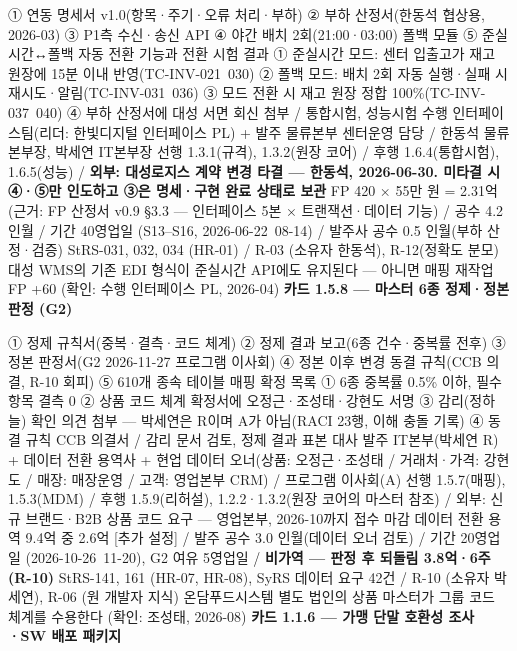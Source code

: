 \documentclass[10pt,a4paper]{article}
\begin{document}
 {① 연동 명세서 v1.0(항목·주기·오류 처리·부하) ② 부하 산정서(한동석 협상용, 2026-03) ③ P1측 수신·송신 API ④ 야간 배치 2회(21:00·03:00) 폴백 모듈 ⑤ 준실시간↔폴백 자동 전환 기능과 전환 시험 결과}
 {① 준실시간 모드: 센터 입출고가 재고 원장에 15분 이내 반영(TC-INV-021~030) ② 폴백 모드: 배치 2회 자동 실행·실패 시 재시도·알림(TC-INV-031~036) ③ 모드 전환 시 재고 원장 정합 100\%(TC-INV-037~040) ④ 부하 산정서에 대성 서면 회신 첨부 / 통합시험, 성능시험}
 {수행 인터페이스팀(리더: 한빛디지털 인터페이스 PL) + 발주 물류본부 센터운영 담당 / 한동석 물류본부장, 박세연 IT본부장}
 {선행 1.3.1(규격), 1.3.2(원장 코어) / 후행 1.6.4(통합시험), 1.6.5(성능) / \textbf{외부: 대성로지스 계약 변경 타결 — 한동석, 2026-06-30. 미타결 시 ④·⑤만 인도하고 ③은 명세·구현 완료 상태로 보관}}
 {FP 420 × 55만 원 = 2.31억 (근거: FP 산정서 v0.9 §3.3 — 인터페이스 5본 × 트랜잭션·데이터 기능) / 공수 4.2 인월 / 기간 40영업일 (S13–S16, 2026-06-22~08-14) / 발주사 공수 0.5 인월(부하 산정·검증)}
 {StRS-031, 032, 034 (HR-01) / R-03 (소유자 한동석), R-12(정확도 분모)}
 {대성 WMS의 기존 EDI 형식이 준실시간 API에도 유지된다 — 아니면 매핑 재작업 FP +60 (확인: 수행 인터페이스 PL, 2026-04)}
\needspace{80mm}\noindent\textbf{카드 1.5.8 — 마스터 6종 정제·정본 판정 (G2)}\par\vspace{1mm}
 {① 정제 규칙서(중복·결측·코드 체계) ② 정제 결과 보고(6종 건수·중복률 전후) ③ 정본 판정서(G2 2026-11-27 프로그램 이사회) ④ 정본 이후 변경 동결 규칙(CCB 의결, R-10 회피) ⑤ 610개 종속 테이블 매핑 확정 목록}
 {① 6종 중복률 0.5\% 이하, 필수 항목 결측 0 ② 상품 코드 체계 확정서에 오정근·조성태·강현도 서명 ③ 감리(정하늘) 확인 의견 첨부 — 박세연은 R이며 A가 아님(RACI 23행, 이해 충돌 기록) ④ 동결 규칙 CCB 의결서 / 감리 문서 검토, 정제 결과 표본 대사}
 {발주 IT본부(박세연 R) + 데이터 전환 용역사 + 현업 데이터 오너(상품: 오정근·조성태 / 거래처·가격: 강현도 / 매장: 매장운영 / 고객: 영업본부 CRM) / 프로그램 이사회(A)}
 {선행 1.5.7(매핑), 1.5.3(MDM) / 후행 1.5.9(리허설), 1.2.2·1.3.2(원장 코어의 마스터 참조) / 외부: 신규 브랜드·B2B 상품 코드 요구 — 영업본부, 2026-10까지 접수 마감}
 {데이터 전환 용역 9.4억 중 2.6억 [추가 설정] / 발주 공수 3.0 인월(데이터 오너 검토) / 기간 20영업일 (2026-10-26~11-20), G2 여유 5영업일 / \textbf{비가역 — 판정 후 되돌림 3.8억·6주(R-10)}}
 {StRS-141, 161 (HR-07, HR-08), SyRS 데이터 요구 42건 / R-10 (소유자 박세연), R-06 (원 개발자 지식)}
 {온담푸드시스템 별도 법인의 상품 마스터가 그룹 코드 체계를 수용한다 (확인: 조성태, 2026-08)}
\needspace{80mm}\noindent\textbf{카드 1.1.6 — 가맹 단말 호환성 조사·SW 배포 패키지}\par\vspace{1mm}
\end{document}
